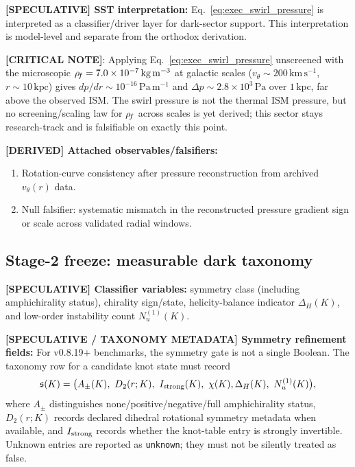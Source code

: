 \textbf{[SPECULATIVE] SST interpretation:}
Eq.~\eqref{eq:exec_swirl_pressure} is interpreted as a classifier/driver layer for dark-sector support. This interpretation is model-level and separate from the orthodox derivation.

\textbf{[CRITICAL NOTE]}: Applying Eq.~\eqref{eq:exec_swirl_pressure} unscreened with the microscopic $\rho_{\!f}=7.0\times10^{-7}\,\mathrm{kg\,m^{-3}}$ at galactic scales ($v_\theta\sim200\,\mathrm{km\,s^{-1}}$, $r\sim10\,\mathrm{kpc}$) gives $dp/dr\sim10^{-16}\,\mathrm{Pa\,m^{-1}}$ and $\Delta p\sim2.8\times10^{3}\,\mathrm{Pa}$ over $1\,\mathrm{kpc}$, far above the observed ISM. The swirl pressure is not the thermal ISM pressure, but no screening/scaling law for $\rho_{\!f}$ across scales is yet derived; this sector stays research-track and is falsifiable on exactly this point.

\textbf{[DERIVED] Attached observables/falsifiers:}
\begin{enumerate}
    \item Rotation-curve consistency after pressure reconstruction from archived $v_\theta(r)$ data.
    \item Null falsifier: systematic mismatch in the reconstructed pressure gradient sign or scale across validated radial windows.
\end{enumerate}

\subsection{Stage-2 freeze: measurable dark taxonomy}
\textbf{[SPECULATIVE] Classifier variables:}
symmetry class (including amphichirality status), chirality sign/state, helicity-balance indicator $\Delta_H(K)$, and low-order instability count $N_u^{(1)}(K)$.

\textbf{[SPECULATIVE / TAXONOMY METADATA] Symmetry refinement fields:}
For v0.8.19+ benchmarks, the symmetry gate is not a single Boolean.  The taxonomy row for a candidate knot state must record
\begin{align}
    \mathfrak{s}(K)
    =
    \big(
    A_{\pm}(K),\ D_{2}(r;K),\ I_{\rm strong}(K),\ \chi(K),
    \Delta_H(K),\ N_u^{(1)}(K)
    \big),
    \label{eq:rt_dark_symmetry_metadata_vector}
\end{align}
where $A_{\pm}$ distinguishes none/positive/negative/full amphichirality status, $D_2(r;K)$ records declared dihedral rotational symmetry metadata when available, and $I_{\rm strong}$ records whether the knot-table entry is strongly invertible.  Unknown entries are reported as \texttt{unknown}; they must not be silently treated as false.

